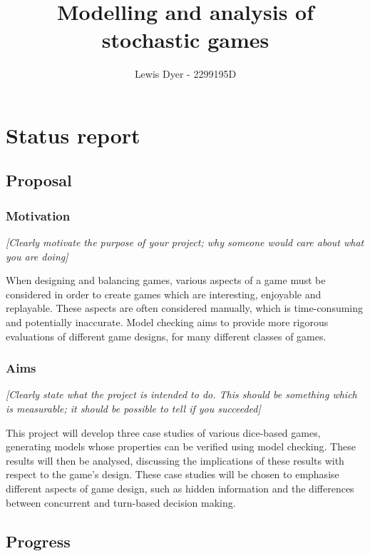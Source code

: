 \documentclass[11pt]{article}
\title{Modelling and analysis of stochastic games}
\author{ Lewis Dyer - 2299195D }
\begin{document}
    \maketitle
    
    
     

\section{Status report}

\subsection{Proposal}\label{proposal}

\subsubsection{Motivation}\label{motivation}

\emph{{[}Clearly motivate the purpose of your project; why someone would
care about what you are doing{]}}

When designing and balancing games, various aspects of a game must be considered in order to create games which are interesting, enjoyable and replayable. These aspects are often considered manually, which is time-consuming and potentially inaccurate. Model checking aims to provide more rigorous evaluations of different game designs, for many different classes of games.

\subsubsection{Aims}\label{aims}

\emph{{[}Clearly state what the project is intended to do. This should
be something which is measurable; it should be possible to tell if you
succeeded{]}}

This project will develop three case studies of various dice-based games, generating models whose properties can be verified using model checking. These results will then be analysed, discussing the implications of these results with respect to the game's design. These case studies will be chosen to emphasise different aspects of game design, such as hidden information and the differences between concurrent and turn-based decision making.

\subsection{Progress}\label{progress}
\end{document}
